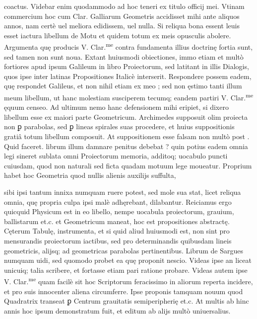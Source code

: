 \documentclass[11pt,a4paper]{article}
\begin{document}
coactus. Videbar enim quodammodo ad hoc teneri ex titulo officij mei. Vtinam commercium hoc cum Clar. Galliarum Geometris accidisset mihi ante aliquos annos, nam certè uel meliora edidissem, uel nulla. Si reliqua bona essent leuis esset iactura libellum de Motu et quidem totum ex meis opusculis abolere. Argumenta quę producis V. Clar.\textsuperscript{me} contra fundamenta illius doctrinę fortia sunt, sed tamen non sunt noua. Extant huiusmodi obiectiones, immo etiam et multò fortiores apud ipsum Galileum in libro Proiectorum, sed latitant in illis Dialogis, quos ipse inter latinas Propositiones Italicè interserit. Respondere possem eadem, quę respondet Galileus, et non nihil etiam ex meo ; sed non ęstimo tanti illum meum libellum, ut hanc molestiam susciperem tecumq; eandem partiri V. Clar.\textsuperscript{me} ęquum censeo. Ad ultimum nemo hanc defensionem mihi eripiet, si dixero libellum esse ex maiori parte Geometricum. Archimedes supposuit olim proiecta non ꝑ parabolas, sed ꝑ lineas spirales suas procedere, et huius suppositionis gratiâ totum libellum composuit. At suppositionem esse falsam non multò post . Quid faceret. librum  illum damnare penitus debebat ? quin potius eadem omnia legi sineret sublata omni Proiectorum memoria, additoq; uocabulo puncti cuiusdam, quod non naturali sed ficta quadam motuum lege moueatur. Proprium habet hoc Geometria quod nullis alienis auxilijs suffulta,


sibi ipsi tantum innixa numquam ruere potest, sed mole sua stat, licet reliqua omnia, quę propria culpa ipsi malè adhęrebant, dilabantur. Reiciamus ergo quicquid Physicum est in eo libello, nempe uocabula proiectorum, grauium, ballistarum et.c. et Geometricum maneat, hoc est propositiones abstractę. Cęterum Tabulę, instrumenta, et si quid aliud huiusmodi est, non sint pro mensurandis proiectorum iactibus, sed pro determinandis quibusdam lineis geometricis, alijsq; ad geometricas parabolas pertinentibus. Librum de Sargues numquam uidi, sed quomodo probet ea quę proponit nescio. Videas ipse an liceat unicuiq; talia scribere, et fortasse etiam pari ratione probare. Videas autem ipse V. Clar.\textsuperscript{me} quam facilè sit hoc  Scriptorum feracissimo in aliorum reperta incidere, et pro suis innocenter aliena circumferre. Ipse proponis tamquam nouum quod Quadratrix transeat ꝑ Centrum grauitatis semiperipherię et.c. At multis ab hinc annis hoc ipsum demonstratum fuit, et editum ab alijs multò uniuersalius.
\end{document}
